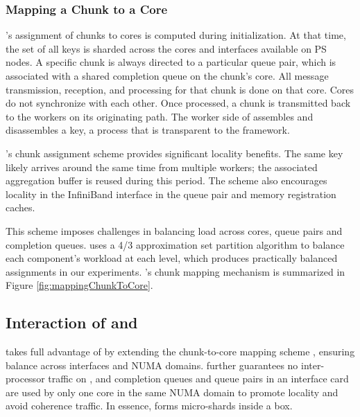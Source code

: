 \subsubsection{Mapping a Chunk to a Core}
\label{sec:chunk2core}
\phub's assignment of chunks to cores is computed during initialization. At that time, the set of all keys is sharded across the cores and interfaces available on PS nodes.
A specific chunk is always directed to a particular queue pair,
which is associated with a shared completion queue on the chunk's core.
All message transmission, reception, and processing for that chunk is done on that core. Cores do not synchronize with each other. Once processed, a chunk is transmitted back to the workers on its originating path. The worker side of \phub assembles and disassembles a key, a process that is transparent to the framework.

\phub{}'s chunk assignment scheme provides significant locality benefits. The same key likely arrives around the same time from multiple workers; the associated aggregation buffer is reused during this period. The scheme also encourages locality in the InfiniBand interface in the queue pair and memory registration caches. %

This scheme imposes challenges in balancing load across cores, queue pairs and completion queues. \phub uses a 4/3 approximation set partition algorithm to balance each component's workload at each level, which produces practically balanced assignments in our experiments. \phub{}'s chunk mapping mechanism is summarized in Figure \ref{fig:mappingChunkToCore}.




\subsection{Interaction of \pbox and \phub}
\phub takes full advantage of \pbox by extending the chunk-to-core mapping scheme%
, ensuring balance across interfaces and NUMA domains. \phub further guarantees no inter-processor traffic on \pbox, and completion queues and queue pairs in an interface card are used by only one core in the same NUMA domain to promote locality and avoid coherence traffic. In essence, \pbox forms micro-shards inside a box.